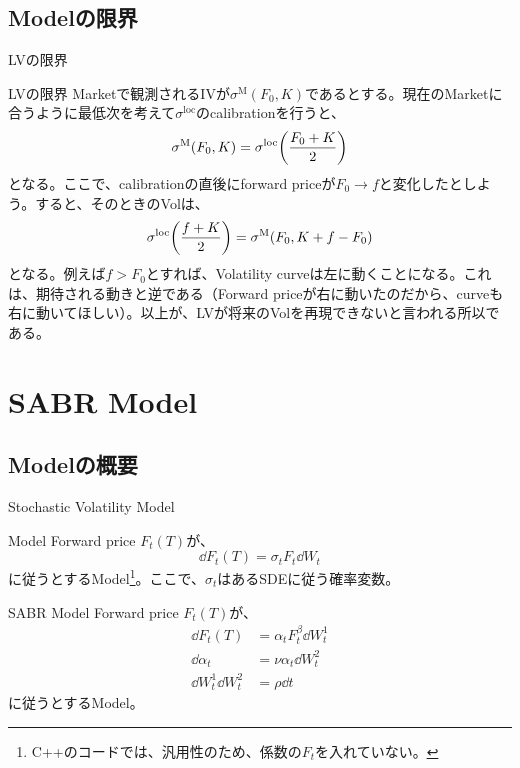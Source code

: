 \documentclass[dvipdfmx,9pt]{beamer}
\begin{document}
\subsection{Modelの限界}
\begin{frame}{LVの限界}
  \begin{block}{LVの限界}
    Marketで観測されるIVが$\sigma^{\mathrm{M}}(F_{0},K)$であるとする。現在のMarketに合うように最低次を考えて$\sigma^{\mathrm{loc}}$のcalibrationを行うと、
    \begin{equation}
      \sigma^{\mathrm{M}}(F_{0},K) = \sigma^{\mathrm{loc}}\pqty{\frac{F_{0}+K}{2}}
    \end{equation}
    となる。ここで、calibrationの直後にforward priceが$F_{0} \to f$と変化したとしよう。すると、そのときのVolは、
    \begin{equation}
      \sigma^{\mathrm{loc}}\pqty{\frac{f+K}{2}} = \sigma^{\mathrm{M}}(F_{0},K+f-F_{0})
    \end{equation}
    となる。例えば$f>F_{0}$とすれば、Volatility curveは左に動くことになる。これは、期待される動きと逆である（Forward priceが右に動いたのだから、curveも右に動いてほしい）。以上が、LVが将来のVolを再現できないと言われる所以である。
  \end{block}
\end{frame}

\section{SABR Model}
\subsection{Modelの概要}
\begin{frame}{Stochastic Volatility Model}
  \begin{block}{Model}
    Forward price $F_{t}(T)$が、
    \begin{equation}
      \dd F_{t}(T) = \sigma_{t} F_{t} \dd W_{t}
    \end{equation}
    に従うとするModel\footnote{C++のコードでは、汎用性のため、係数の$F_{t}$を入れていない。}。ここで、$\sigma_{t}$はあるSDEに従う確率変数。
  \end{block}
  \begin{block}{SABR Model}
    Forward price $F_{t}(T)$が、
    \begin{align}
      \dd F_{t}(T)                & = \alpha_{t} F_{t}^{\beta} \dd W_{t}^{1} \\
      \dd \alpha_{t}              & = \nu \alpha_{t} \dd W_{t}^{2}           \\
      \dd W_{t}^{1} \dd W_{t}^{2} & = \rho \dd t
    \end{align}
    に従うとするModel。
  \end{block}
\end{frame}
\end{document}

